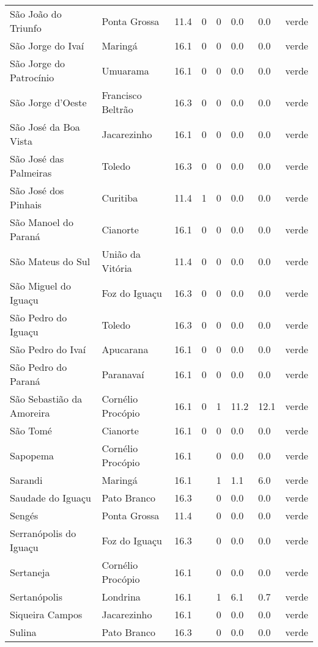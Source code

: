 \begin{longtable}{l|lllllll}
  São João do Triunfo & Ponta Grossa & 11.4 & 0 & 0 & 0.0 & 0.0 & verde \\ 
  São Jorge do Ivaí & Maringá & 16.1 & 0 & 0 & 0.0 & 0.0 & verde \\ 
  São Jorge do Patrocínio & Umuarama & 16.1 & 0 & 0 & 0.0 & 0.0 & verde \\ 
  São Jorge d'Oeste & Francisco Beltrão & 16.3 & 0 & 0 & 0.0 & 0.0 & verde \\ 
  São José da Boa Vista & Jacarezinho & 16.1 & 0 & 0 & 0.0 & 0.0 & verde \\ 
  São José das Palmeiras & Toledo & 16.3 & 0 & 0 & 0.0 & 0.0 & verde \\ 
  São José dos Pinhais & Curitiba & 11.4 & 1 & 0 & 0.0 & 0.0 & verde \\ 
  São Manoel do Paraná & Cianorte & 16.1 & 0 & 0 & 0.0 & 0.0 & verde \\ 
  São Mateus do Sul & União da Vitória & 11.4 & 0 & 0 & 0.0 & 0.0 & verde \\ 
  São Miguel do Iguaçu & Foz do Iguaçu & 16.3 & 0 & 0 & 0.0 & 0.0 & verde \\ 
  São Pedro do Iguaçu & Toledo & 16.3 & 0 & 0 & 0.0 & 0.0 & verde \\ 
  São Pedro do Ivaí & Apucarana & 16.1 & 0 & 0 & 0.0 & 0.0 & verde \\ 
  São Pedro do Paraná & Paranavaí & 16.1 & 0 & 0 & 0.0 & 0.0 & verde \\ 
  São Sebastião da Amoreira & Cornélio Procópio & 16.1 & 0 & 1 & 11.2 & 12.1 & verde \\ 
  São Tomé & Cianorte & 16.1 & 0 & 0 & 0.0 & 0.0 & verde \\ 
  Sapopema & Cornélio Procópio & 16.1 &  & 0 & 0.0 & 0.0 & verde \\ 
  Sarandi & Maringá & 16.1 &  & 1 & 1.1 & 6.0 & verde \\ 
  Saudade do Iguaçu & Pato Branco & 16.3 &  & 0 & 0.0 & 0.0 & verde \\ 
  Sengés & Ponta Grossa & 11.4 &  & 0 & 0.0 & 0.0 & verde \\ 
  Serranópolis do Iguaçu & Foz do Iguaçu & 16.3 &  & 0 & 0.0 & 0.0 & verde \\ 
  Sertaneja & Cornélio Procópio & 16.1 &  & 0 & 0.0 & 0.0 & verde \\ 
  Sertanópolis & Londrina & 16.1 &  & 1 & 6.1 & 0.7 & verde \\ 
  Siqueira Campos & Jacarezinho & 16.1 &  & 0 & 0.0 & 0.0 & verde \\ 
  Sulina & Pato Branco & 16.3 &  & 0 & 0.0 & 0.0 & verde \\ 

\end{longtable}
